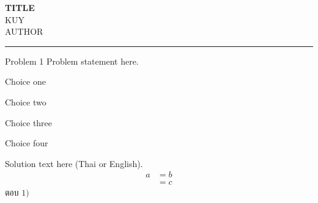 \documentclass[11pt]{scrartcl}
\newcommand{\groupctx}[2]{\bigskip\noindent\textbf{Questions #1.} \textit{#2}\par\medskip}
\begin{document}
\begin{center}
{\LARGE\bfseries TITLE}\\[4pt]
{\large KUY}\\[2pt]
{AUTHOR}
\end{center}

\bigskip
\hrule
\bigskip


\bigskip


\begin{problembox}{Problem 1}
Problem statement here.


\begin{choices}
\item Choice one
\item Choice two
\item Choice three
\item Choice four
\end{choices}
\end{problembox}

\begin{solutionbox}
  Solution text here (Thai or English).
  \begin{align*}
    a &= b \\
      &= c
  \end{align*}
  ตอบ $\boxed{1)}$
\end{solutionbox}
\end{document}
